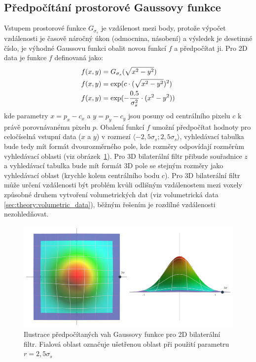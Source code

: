 \subsection*{Předpočítání prostorové Gaussovy funkce}
Vstupem prostorové funkce $G_{\sigma_s}$ je  vzdálenost mezi body, protože výpočet vzdálenosti je časově náročný úkon (odmocnina, násobení) a výsledek je desetinné číslo, je výhodné Gaussovu funkci obalit novou funkcí $f$ a předpočítat ji. Pro 2D data je funkce $f$ definovaná jako:
\begin{align}
    \centering
    \label{eq:bl_space_lookup}
    f(x, y) &= G_{\sigma_s}(\sqrt{x^2 - y^2}) \\
    f(x, y) &= \exp(c \cdot (\sqrt{x^2 - y^2})^2) \\
    f(x, y) &= \exp(-\frac{0.5}{\sigma_s^2} \cdot (x^2 - y^2))
\end{align}
kde parametry $x = p_x - c_x$ a $y = p_y - c_y $ jsou posuny od centrálního pixelu $c$ k právě porovnávanému pixelu $p$. Obalení funkcí $f$ umožní předpočítat hodnoty pro celočíselná vstupní data ($x$ a $y$) v rozmezí $\langle-2,5\sigma_s;2,5\sigma_s\rangle$, vyhledávací tabulka bude tedy mít formát dvourozměrného pole, kde rozměry odpovídají rozměrům vyhledávací oblasti (viz obrázek~\ref{fig:bf:3d_gauss}). Pro 3D bilaterální filtr přibude souřadnice $z$ a vyhledávací tabulka bude mít formát 3D pole se stejným rozměry jako vyhledávací oblast (krychle kolem centrálního bodu $c$). Pro 3D bilaterální filtr může určení vzdálenosti být problém kvůli odlišným vzdálenostem mezi voxely způsobné druhem vytvoření volumetrických dat (viz volumetrická data \ref{sec:theory:volumetric_data}), běžným řešením je rozdílné vzdálenosti nezohledňovat. 

\begin{figure} [H]
    \centering
    \label{fig:bf:3d_gauss}
    \includegraphics[width=1\textwidth]{figures/bf-3d-gauss-1.png}
    \caption{Ilustrace předpočítaných vah Gaussovy funkce pro 2D bilaterální filtr. Fialová oblast označuje ušetřenou oblast při použití parametru $r = 2,5\sigma_s$}
\end{figure}

